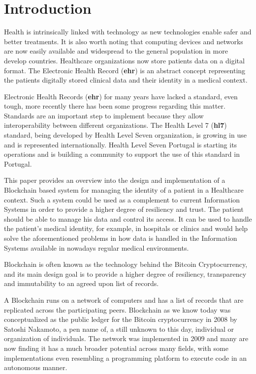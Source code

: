 \chapter{Introduction}\label{introduction}

Health is intrinsically linked with technology as new technologies enable safer
and better treatments. It is also worth noting that computing devices and
networks are now easily available and widespread to the general population in
more develop countries. Healthcare organizations now store patients data on a
digital format. The Electronic Health Record (\textbf{ehr}) is an abstract
concept representing the patients digitally stored clinical data and their
identity in a medical context.

Electronic Health Records (\textbf{ehr}) for many years have lacked a standard,
even tough, more recently there has been some progress regarding this matter.
Standards are an important step to implement because they allow
interoperability between different organizations. The Health Level 7
(\textbf{hl7}) standard, being developed by Health Level Seven organization, is
growing in use and is represented internationally. Health Level Seven Portugal
is starting its operations and is building a community to support the use of
this standard in Portugal. \cite{HealthLevel7}

This paper provides an overview into the design and implementation of a
Blockchain based system for managing the identity of a patient in a Healthcare
context. Such a system could be used as a complement to current Information
Systems in order to provide a higher degree of resiliency and trust. The
patient should be able to manage his data and control its access. It can be
used to handle the patient’s medical identity, for example, in hospitals or
clinics and would help solve the aforementioned problems in how data is handled
in the Information Systems available in nowadays regular medical environments.

Blockchain is often known as the technology behind the Bitcoin Cryptocurrency,
and its main design goal is to provide a higher degree of resiliency,
transparency and immutability to an agreed upon list of records.

A Blockchain runs on a network of computers and has a list of records that are
replicated across the participating peers. Blockchain as we know today was
conceptualized as the public ledger for the Bitcoin cryptocurrency in 2008 by
Satoshi Nakamoto, a pen name of, a still unknown to this day, individual or
organization of individuals. The network was implemented in 2009 and many are
now finding it has a much broader potential across many fields, with some
implementations even resembling a programming platform to execute code in an
autonomous manner.  \cite{Nakamoto2008}

